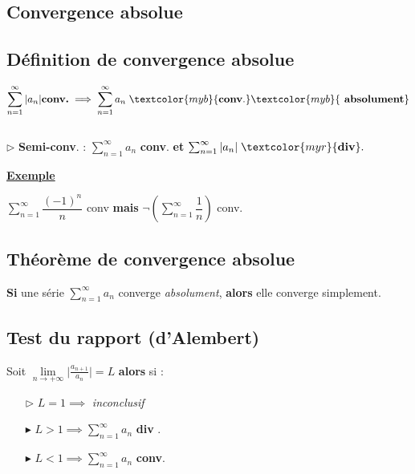\documentclass{report}
\begin{document}
\begin{multicols*}{3}
\chapter{Convergence absolue}
    \section{Définition de convergence absolue}
    \vspace{-2em}
     \[%
        \sum_{n=1}^{\infty }|a_n| \textbf{conv.} \implies 
        \sum_{n=1}^{\infty }a_n \; \textcolor{myb}{\textbf{conv}.} 
        \textcolor{myb}{\textbf{ absolument}}  
     \]%
    \\
    $\rhd$  \textbf{Semi-conv}. : $\sum_{n=1}^{\infty }a_n$ \textbf{conv}. \; 
        \textbf{et} $\sum_{n=1}^{\infty }|a_n| \; \textcolor{myr}{\textbf{div}}.$ 
     
    \vspace{1em}
    \noindent 
    \underline{\textbf{Exemple}} 


    \noindent 
    $\sum_{n=1}^{\infty }\dfrac{(-1)^n}{n}$ conv 
          \textbf{mais} $\neg(\sum_{n=1}^{\infty }\dfrac{1}{n})$ conv.  

    
    \section{Théorème de convergence absolue}
    \textbf{Si} une série $\sum_{n=1}^{\infty }a_n$ converge \textit{absolument}, 
       \textbf{alors} elle converge simplement.  


    \section{Test du rapport (d'Alembert)}
    Soit $\lim\limits_{n \to+\infty } \Big|\frac{a_{n+1}}{a_n}  \Big| = L$ 
    \textbf{alors} si :   
    \begin{itemize}
    \item [$\rhd$ ] $L = 1 \implies$ \textit{ inconclusif}  
    \item [$\blacktriangleright$ ] $L > 1 \implies \sum_{n=1}^{\infty } a_n$ 
      \textcolor{myr}{\textbf{div}} .   
    \item [$\blacktriangleright$ ] $L < 1 \implies \sum_{n=1}^{\infty } a_n$ 
    \textcolor{myb}{\textbf{conv}}. 
    \end{itemize}



\end{multicols*}
\end{document}
